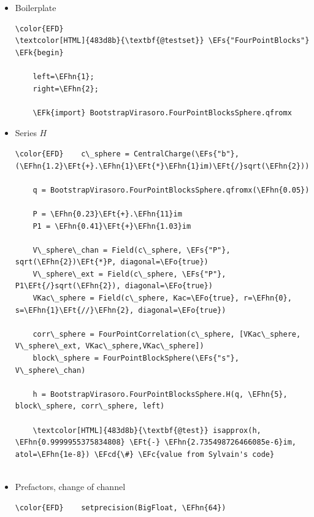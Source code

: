 \documentclass[a4paper]{article}
\numberwithin{equation}{section}
\newcommand{\EFc}[1]{\textcolor{EFc}{#1}} %
\newcommand{\EFcd}[1]{\textcolor{EFcd}{#1}} %
\newcommand{\EFs}[1]{\textcolor{EFs}{#1}} %
\newcommand{\EFk}[1]{\textcolor{EFk}{#1}} %
\newcommand{\EFt}[1]{\textcolor{EFt}{#1}} %
\newcommand{\EFo}[1]{\textcolor{EFo}{#1}} %
\newcommand{\EFhn}[1]{\textcolor{EFhn}{#1}} %
\begin{document}
\begin{itemize}
\item Boilerplate
\label{sec:orgf426b35}

\begin{Code}
\begin{Verbatim}
\color{EFD}
\textcolor[HTML]{483d8b}{\textbf{@testset}} \EFs{"FourPointBlocks"} \EFk{begin}

    left=\EFhn{1};
    right=\EFhn{2};

    \EFk{import} BootstrapVirasoro.FourPointBlocksSphere.qfromx

\end{Verbatim}
\end{Code}
\item Series \(H\)
\label{sec:orgc33bbd2}

\begin{Code}
\begin{Verbatim}
\color{EFD}    c\_sphere = CentralCharge(\EFs{"b"}, (\EFhn{1.2}\EFt{+}.\EFhn{1}\EFt{*}\EFhn{1}im)\EFt{/}sqrt(\EFhn{2}))

    q = BootstrapVirasoro.FourPointBlocksSphere.qfromx(\EFhn{0.05})

    P = \EFhn{0.23}\EFt{+}.\EFhn{11}im
    P1 = \EFhn{0.41}\EFt{+}\EFhn{1.03}im

    V\_sphere\_chan = Field(c\_sphere, \EFs{"P"}, sqrt(\EFhn{2})\EFt{*}P, diagonal=\EFo{true})
    V\_sphere\_ext = Field(c\_sphere, \EFs{"P"}, P1\EFt{/}sqrt(\EFhn{2}), diagonal=\EFo{true})
    VKac\_sphere = Field(c\_sphere, Kac=\EFo{true}, r=\EFhn{0}, s=\EFhn{1}\EFt{//}\EFhn{2}, diagonal=\EFo{true})

    corr\_sphere = FourPointCorrelation(c\_sphere, [VKac\_sphere, V\_sphere\_ext, VKac\_sphere,VKac\_sphere])
    block\_sphere = FourPointBlockSphere(\EFs{"s"}, V\_sphere\_chan)

    h = BootstrapVirasoro.FourPointBlocksSphere.H(q, \EFhn{5}, block\_sphere, corr\_sphere, left)

    \textcolor[HTML]{483d8b}{\textbf{@test}} isapprox(h, \EFhn{0.9999955375834808} \EFt{-} \EFhn{2.735498726466085e-6}im, atol=\EFhn{1e-8}) \EFcd{\#} \EFc{value from Sylvain's code}


\end{Verbatim}
\end{Code}
\item Prefactors, change of channel
\label{sec:orge4395a9}

\begin{Code}
\begin{Verbatim}
\color{EFD}    setprecision(BigFloat, \EFhn{64})


\end{Verbatim}
\end{Code}
\end{itemize}
\end{document}
